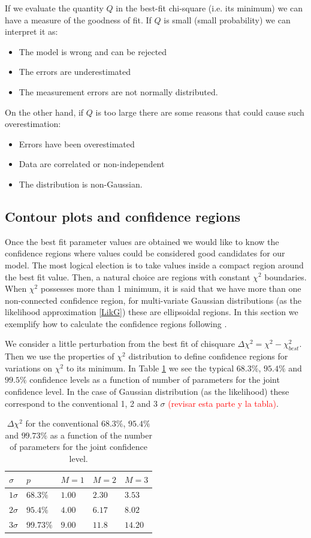 \documentclass[onecolumn,           %
               showpacs,            %
               preprintnumbers,     %
               aps,                 %
               letterpaper,             %
               superscriptaddress,      %
               nofootinbib,         %
               tightenlines,        %
               floats,floatfix      %
               ,usenatbib,
               ]{revtex4-1}
\begin{document}
If we evaluate the quantity $Q$ in the best-fit chi-square (i.e. its minimum) we can have a measure of the goodness of fit. If $Q$ is small (small probability) we can interpret it as:
\begin{itemize}
\item The model is wrong and can be rejected
\item The errors are underestimated 
\item The measurement errors are not normally distributed.
\end{itemize}
On the other hand, if $Q$ is too large there are some reasons that could cause such overestimation:
\begin{itemize}
\item Errors have been overestimated
\item Data are correlated or non-independent
\item The distribution is non-Gaussian.
\end{itemize}
\subsection{Contour plots and confidence regions}

Once the best fit parameter values are obtained we would like to know the confidence regions where values could be considered good candidates for our model. The most logical election is to take values inside a compact region around the best fit value. Then, a natural choice are regions with constant $\chi^2$ boundaries. When $\chi^2$ possesses more than 1 minimum, it is said that we have more than one non-connected confidence region, for multi-variate Gaussian distributions (as the likelihood approximation \eqref{LikG}) these are ellipsoidal regions. In this section we exemplify how to calculate the confidence regions following \cite{LiV}. 

We consider a little perturbation from the best fit of chisquare $\Delta\chi^2=\chi^2-\chi^2_{best}$. Then we use the properties of $\chi^2$ distribution to define confidence regions for variations on $\chi^2$ to its minimum. In Table \ref{tableerrors} we see the typical $68.3 \%$, $95.4\%$ and $99.5\%$ confidence levels as a function of number of parameters for the joint confidence level. In the case of Gaussian distribution (as the likelihood) these correspond to the conventional 1, 2 and 3 $\sigma$ \textcolor{red}{(revisar esta parte y la tabla)}.
\begin{table}[h!]
\centering
\begin{tabular}{||l|l|l|l|l||} 
 \hline
$\sigma$ & $p$ & $M=1$ & $M=2$ & $M=3$\\
\hline
$1\sigma$ & $68.3 \%$ & $1.00$ & $2.30$ & $3.53$\\
$2\sigma$ & $95.4 \%$ & $4.00$ & $6.17$ & $8.02$\\
$3\sigma$ & $99.73\%$ & $9.00$ & $11.8$ & $14.20$\\
\hline
\end{tabular}
\caption{\footnotesize{$\Delta \chi^2$ for the conventional $68.3\%$, $95.4\%$ and $99.73\%$ as a function of the number of parameters for the joint confidence level.}}\label{tableerrors}
\end{table}
\end{document}
